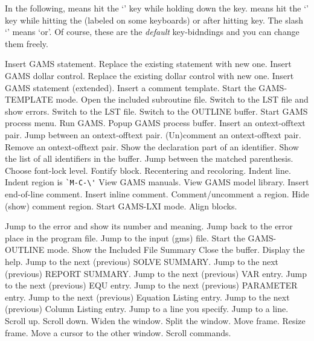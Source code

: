 \documentclass{article}
\begin{document}

In the following,  means hit the `' key while holding down
the  key.  means hit the `' key while hitting
the  (labeled  on some keyboards) or after hitting
 key.  The slash `\kbd{/}' means `or'.  Of course, these are
the {\it default} key-bidndings and you can change them freely.



 Insert GAMS statement.
 Replace the existing statement with new one.
 Insert GAMS dollar control.
 Replace the existing dollar control with new one.
 Insert GAMS statement (extended).
 Insert a comment template.
 Start the GAMS-TEMPLATE mode.
 Open the included subroutine file.
\key{} 
 Switch to the LST file and show errors.
 Switch to the LST file.
  Switch to the OUTLINE buffer.
\key{} 
  Start GAMS process menu.
  Run GAMS.
  Popup GAMS process buffer.
\key{} 
  Insert an ontext-offtext pair.
  Jump between an ontext-offtext pair.
  (Un)comment an ontext-offtext pair.
  Remove an ontext-offtext pair.
\key{} 
  Show the declaration part of an identifier.
  Show the list of all identifiers in the buffer.
  Jump between the matched parenthesis.
  Choose font-lock level.
  Fontify block.
  Recentering and recoloring.
  Indent line.
\key{} Indent region is \verb|`M-C-\'|
  View GAMS manuals.
  View GAMS model library.
  Insert end-of-line comment.
  Insert inline comment.
  Comment/uncomment a region.
  Hide (show) comment region.
  Start GAMS-LXI mode.
  Align blocks.



   Jump to the error and show its number and meaning.
  Jump back to the error place in the program file.
  Jump to the input (gms) file.
  Start the GAMS-OUTLINE mode.
  Show the Included File Summary
\key{} 
  Close the buffer.
  Display the help.
\key{} 
  Jump to the next (previous) SOLVE SUMMARY.
  Jump to the next (previous) REPORT SUMMARY.
  Jump to the next (previous) VAR entry.
  Jump to the next (previous) EQU entry.
  Jump to the next (previous) PARAMETER entry.
  Jump to the next (previous) Equation Listing entry.
  Jump to the next (previous) Column Listing entry.
  Jump to a line you specify.
  Jump to a line.
\key{} 
  Scroll up.
  Scroll down.
  Widen the window.
  Split the window.
  Move frame.
  Resize frame.
  Move a cursor to the other window.
\key{} 
          Scroll commands.
\end{document}
